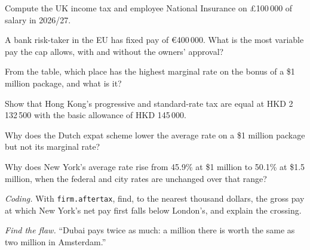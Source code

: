 \begin{exercise}[$\star$]\label{exo:in:pay-regulation-and-tax-by-location:1}
Compute the UK income tax and employee National Insurance on \pounds100\,000 of salary in 2026/27.
\end{exercise}

\begin{exercise}[$\star$]\label{exo:in:pay-regulation-and-tax-by-location:2}
A bank risk-taker in the EU has fixed pay of \euro400\,000. What is the most variable pay the cap allows, with and without
the owners' approval?
\end{exercise}

\begin{exercise}[$\star$]\label{exo:in:pay-regulation-and-tax-by-location:3}
From the table, which place has the highest marginal rate on the bonus of a \$1 million package, and what is it?
\end{exercise}

\begin{exercise}[$\star\star$]\label{exo:in:pay-regulation-and-tax-by-location:4}
Show that Hong Kong's progressive and standard-rate tax are equal at HKD 2\,132\,500 with the basic allowance of HKD
145\,000.
\end{exercise}

\begin{exercise}[$\star\star$]\label{exo:in:pay-regulation-and-tax-by-location:5}
Why does the Dutch expat scheme lower the average rate on a \$1 million package but not its marginal rate?
\end{exercise}

\begin{exercise}[$\star\star$]\label{exo:in:pay-regulation-and-tax-by-location:6}
Why does New York's average rate rise from 45.9\% at \$1 million to 50.1\% at \$1.5 million, when the federal and city rates
are unchanged over that range?
\end{exercise}

\begin{exercise}[$\star\star\star$]\label{exo:in:pay-regulation-and-tax-by-location:7}
\emph{Coding.} With \texttt{firm.aftertax}, find, to the nearest thousand dollars, the gross pay at which New York's net
pay first falls below London's, and explain the crossing.
\end{exercise}

\begin{exercise}[$\star\star\star$]\label{exo:in:pay-regulation-and-tax-by-location:8}
\emph{Find the flaw.} ``Dubai pays twice as much: a million there is worth the same as two million in Amsterdam.''
\end{exercise}

